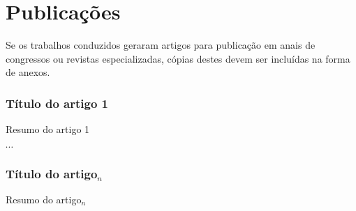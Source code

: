 \section{Publicações}\label{sec:publicacoes}

Se os trabalhos conduzidos geraram artigos para publicação em anais de congressos ou revistas especializadas, cópias destes devem ser incluídas na forma de anexos.

\subsubsection{Título do artigo 1}

%
Resumo do artigo 1

$\cdots$

\subsubsection{Título do artigo$_n$}

Resumo do artigo$_n$

%